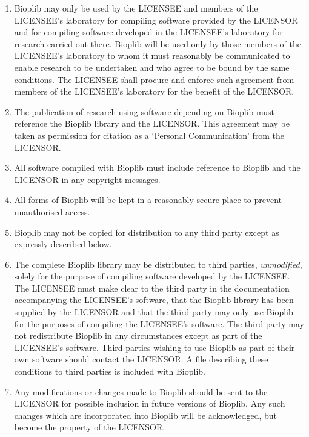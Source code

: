 \documentclass[12pt]{article}
\begin{document}
\begin{enumerate}
\item Bioplib may only be used by the LICENSEE and members of the
LICENSEE's laboratory for compiling software provided by the
LICENSOR and for compiling software developed in the LICENSEE's
laboratory for research carried out there.
Bioplib will be used only by those members of the LICENSEE's laboratory
to whom it must reasonably be communicated to enable research to
be undertaken and who agree to be bound by the same conditions.
The LICENSEE shall procure and enforce such agreement from members of
the LICENSEE's laboratory for the benefit of the LICENSOR.

\item The publication of research using software depending on Bioplib 
must reference the Bioplib library and the LICENSOR. This agreement may 
be taken as permission for citation as a `Personal Communication' from 
the LICENSOR.

\item All software compiled with Bioplib must include reference to Bioplib 
and the LICENSOR in any copyright messages.

\item All forms of Bioplib will be kept in a reasonably secure place to
prevent unauthorised access.

\item Bioplib may not be copied for distribution to any third
party except as expressly described below.

\item The complete Bioplib library may be distributed to third
parties, \emph{unmodified}, solely for the purpose of compiling
software developed by the LICENSEE. The LICENSEE must make clear to
the third party in the documentation accompanying the LICENSEE's
software, that the Bioplib library has been supplied by the LICENSOR
and that the third party may only use Bioplib for the purposes of
compiling the LICENSEE's software. The third party may not
redistribute Bioplib in any circumstances except as part of the
LICENSEE's software. Third parties wishing to use Bioplib as part of
their own software should contact the LICENSOR.  A file describing
these conditions to third parties is included with Bioplib.

\item Any modifications or changes made to Bioplib should be sent to
the LICENSOR for possible inclusion in future versions of Bioplib. Any
such changes which are incorporated into Bioplib will be
acknowledged, but become the property of the LICENSOR.


\end{enumerate}
\end{document}
